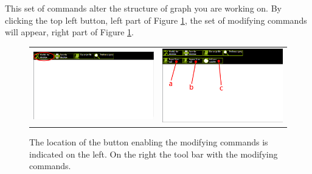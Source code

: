 This set of commands alter the structure of graph you are working on. By clicking the top left button, left part of Figure \ref{fig:modif_toolbar}, the set of modifying commands will appear, right part of Figure \ref{fig:modif_toolbar}.

\begin{figure}
	\centering
\begin{tabular}{ll}
\begin{minipage}[t]{0.49\textwidth}
	\includegraphics[width= \columnwidth]{../src/Chapter_additional/04_EFG_GUI/image/img_01.png}
\end{minipage}
 &
\begin{minipage}[t]{0.49\textwidth}
	\includegraphics[width= \columnwidth]{../src/Chapter_additional/04_EFG_GUI/image/img_02.png}
\end{minipage}
\end{tabular}
	\caption{The location of the button enabling the modifying commands is indicated on the left. On the right the tool bar with the modifying commands.}
	\label{fig:modif_toolbar}
\end{figure}

